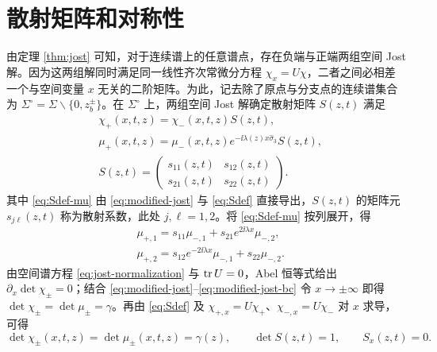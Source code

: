 \section{散射矩阵和对称性}\label{ch:symmetry}

由定理 \ref{thm:jost} 可知，对于连续谱上的任意谱点，存在负端与正端两组空间 Jost 解。因为这两组解同时满足同一线性齐次常微分方程 $\chi_x=U\chi$，二者之间必相差一个与空间变量 $x$ 无关的二阶矩阵。为此，记去除了原点与分支点的连续谱集合为 $\Sigma^\circ=\Sigma\mathbin{\backslash}\{0,z_b^\pm\}$。在 $\Sigma^\circ$ 上，两组空间 Jost 解确定散射矩阵 $S(z,t)$ 满足
\begin{align}
&\chi_+(x,t,z)=\chi_-(x,t,z)S(z,t),\label{eq:Sdef}\\
&\mu_+(x,t,z)=\mu_-(x,t,z)e^{-\ii\lambda(z)x\widehat{\sigma}_3}S(z,t),\label{eq:Sdef-mu}\\
&S(z,t)=\begin{pmatrix}s_{11}(z,t)&s_{12}(z,t)\\s_{21}(z,t)&s_{22}(z,t)\end{pmatrix}.\label{eq:Sdef-matrix}
\end{align}
其中 \eqref{eq:Sdef-mu} 由 \eqref{eq:modified-jost} 与 \eqref{eq:Sdef} 直接导出，$S(z,t)$ 的矩阵元 $s_{j\ell}(z,t)$ 称为散射系数，此处 $j,\ell=1,2$。将 \eqref{eq:Sdef-mu} 按列展开，得
\begin{equation}\label{eq:scattering-columns}
\begin{aligned}
&\mu_{+,1}=s_{11}\mu_{-,1}+s_{21}e^{2\ii\lambda x}\mu_{-,2},\\
&\mu_{+,2}=s_{12}e^{-2\ii\lambda x}\mu_{-,1}+s_{22}\mu_{-,2}.
\end{aligned}
\end{equation}
由空间谱方程 \eqref{eq:jost-normalization} 与 $\operatorname{tr} U=0$，Abel 恒等式给出 $\partial_x\det\chi_\pm=0$；结合 \eqref{eq:modified-jost}--\eqref{eq:modified-jost-bc} 令 $x\to\pm\infty$ 即得 $\det\chi_\pm=\det\mu_\pm=\gamma$。再由 \eqref{eq:Sdef} 及 $\chi_{+,x}=U\chi_+$、$\chi_{-,x}=U\chi_-$ 对 $x$ 求导，可得
\begin{equation}\label{eq:detjost}
\det\chi_\pm(x,t,z)=\det\mu_\pm(x,t,z)=\gamma(z),\qquad
\det S(z,t)=1,\qquad
S_x(z,t)=0.
\end{equation}

